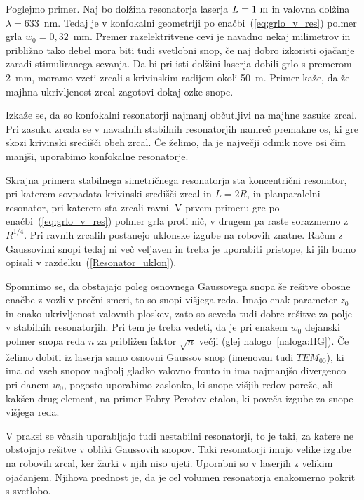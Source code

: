 Poglejmo primer. Naj bo dolžina resonatorja laserja $L=1~\metre$ in valovna
dolžina $\lambda = 633$~nm. Tedaj je v konfokalni geometriji po enačbi~(\ref{eq:grlo_v_res})
polmer grla $w_{0}=0,32$~mm. Premer razelektritvene cevi je navadno
nekaj milimetrov in približno tako debel mora biti tudi svetlobni
snop, če naj dobro izkoristi ojačanje zaradi stimuliranega sevanja.
Da bi pri isti dolžini laserja dobili grlo s premerom 2~mm, moramo vzeti
zrcali s krivinskim radijem okoli 50~m. Primer kaže, da že majhna ukrivljenost 
zrcal zagotovi dokaj ozke snope.

\begin{remark}
Izkaže se, da so konfokalni resonatorji najmanj občutljivi na majhne zasuke zrcal. 
Pri zasuku zrcala se v navadnih stabilnih resonatorjih namreč premakne os, ki gre skozi 
krivinski središči obeh zrcal. Če želimo, da je največji odmik nove osi čim
manjši, uporabimo konfokalne resonatorje. 
\end{remark}

Skrajna primera stabilnega simetričnega resonatorja sta 
koncentrični resonator,
pri katerem sovpadata krivinski središči zrcal in $L=2R$, in planparalelni 
resonator, pri katerem sta zrcali ravni.
V prvem primeru gre po enačbi~(\ref{eq:grlo_v_res}) polmer grla proti nič, v drugem pa raste sorazmerno
z $R^{1/4}$. Pri ravnih zrcalih postanejo uklonske
izgube na robovih znatne. Račun z Gaussovimi snopi tedaj ni več veljaven
in treba je uporabiti pristope, ki jih bomo opisali
v razdelku~(\ref{Resonator_uklon}).

Spomnimo se, da obstajajo poleg osnovnega Gaussovega
snopa še rešitve obosne enačbe z vozli v prečni smeri, to so snopi
višjega reda. Imajo enak parameter $z_{0}$ in enako ukrivljenost
valovnih ploskev, zato so seveda tudi dobre rešitve za polje v stabilnih
resonatorjih. Pri tem je treba vedeti, da je pri enakem $w_{0}$
dejanski polmer snopa reda $n$ za približen faktor $\sqrt{n}$ večji 
(glej nalogo~\ref{naloga:HG}). Če želimo dobiti iz laserja samo 
osnovni Gaussov snop (imenovan tudi $TEM_{00}$), ki ima od vseh snopov
najbolj gladko valovno fronto in ima najmanjšo 
divergenco pri danem $w_0$, pogosto uporabimo zaslonko, ki snope višjih redov poreže, 
ali kakšen drug element, na primer Fabry-Perotov etalon, ki poveča izgube za snope višjega reda.
 
\begin{remark}
V praksi se včasih uporabljajo tudi nestabilni resonatorji, to je
taki, za katere ne obstojajo rešitve v obliki Gaussovih snopov. Taki
resonatorji imajo velike izgube na robovih zrcal, ker žarki v njih niso ujeti. 
Uporabni so v laserjih z velikim ojačanjem. Njihova prednost je, da je cel
volumen resonatorja enakomerno pokrit s svetlobo.
\end{remark}

